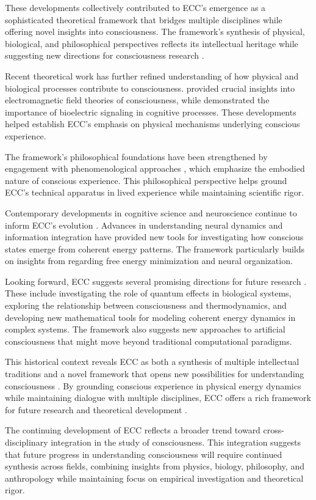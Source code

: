These developments collectively contributed to ECC's emergence as a sophisticated theoretical framework that bridges multiple disciplines while offering novel insights into consciousness. The framework's synthesis of physical, biological, and philosophical perspectives reflects its intellectual heritage while suggesting new directions for consciousness research \cite{adams1981foundations}.

Recent theoretical work has further refined understanding of how physical and biological processes contribute to consciousness. \cite{mcfadden2002cemi} provided crucial insights into electromagnetic field theories of consciousness, while \cite{levin2019computational} demonstrated the importance of bioelectric signaling in cognitive processes. These developments helped establish ECC's emphasis on physical mechanisms underlying conscious experience.

The framework's philosophical foundations have been strengthened by engagement with phenomenological approaches \cite{merleau-ponty1962phenomenology}, which emphasize the embodied nature of conscious experience. This philosophical perspective helps ground ECC's technical apparatus in lived experience while maintaining scientific rigor.

Contemporary developments in cognitive science and neuroscience continue to inform ECC's evolution \cite{varela1991embodied}. Advances in understanding neural dynamics and information integration have provided new tools for investigating how conscious states emerge from coherent energy patterns. The framework particularly builds on insights from \cite{friston2010free} regarding free energy minimization and neural organization.

Looking forward, ECC suggests several promising directions for future research \cite{churchland1986neurophilosophy}. These include investigating the role of quantum effects in biological systems, exploring the relationship between consciousness and thermodynamics, and developing new mathematical tools for modeling coherent energy dynamics in complex systems. The framework also suggests new approaches to artificial consciousness that might move beyond traditional computational paradigms.

This historical context reveals ECC as both a synthesis of multiple intellectual traditions and a novel framework that opens new possibilities for understanding consciousness \cite{bateson1972steps}. By grounding conscious experience in physical energy dynamics while maintaining dialogue with multiple disciplines, ECC offers a rich framework for future research and theoretical development \cite{wiener1948cybernetics}.

The continuing development of ECC reflects a broader trend toward cross-disciplinary integration in the study of consciousness. This integration suggests that future progress in understanding consciousness will require continued synthesis across fields, combining insights from physics, biology, philosophy, and anthropology while maintaining focus on empirical investigation and theoretical rigor.